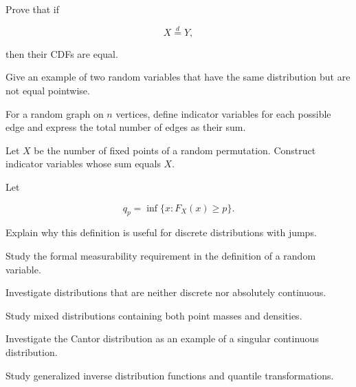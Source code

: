 \begin{exercise}[3]
Prove that if

\[
X\overset{d}{=}Y,
\]

then their CDFs are equal.
\end{exercise}

\begin{exercise}[3]
Give an example of two random variables that have the same distribution
but are not equal pointwise.
\end{exercise}

\begin{exercise}[3]
For a random graph on \(n\) vertices, define indicator variables for
each possible edge and express the total number of edges as their sum.
\end{exercise}

\begin{exercise}[3]
Let \(X\) be the number of fixed points of a random permutation.
Construct indicator variables whose sum equals \(X\).
\end{exercise}

\begin{exercise}[3]
Let

\[
q_p
=
\inf\{x:F_X(x)\geq p\}.
\]

Explain why this definition is useful for discrete distributions with
jumps.
\end{exercise}

\begin{exercise}[4]
Study the formal measurability requirement in the definition of a random
variable.
\end{exercise}

\begin{exercise}[4]
Investigate distributions that are neither discrete nor absolutely
continuous.
\end{exercise}

\begin{exercise}[4]
Study mixed distributions containing both point masses and densities.
\end{exercise}

\begin{exercise}[4]
Investigate the Cantor distribution as an example of a singular
continuous distribution.
\end{exercise}

\begin{exercise}[4]
Study generalized inverse distribution functions and quantile
transformations.
\end{exercise}


